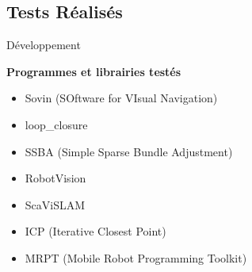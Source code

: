 \documentclass{beamer}
\begin{document}
\subsection*{Tests Réalisés}
\begin{frame}{Développement}
  \begin{center}
    \begin{Large}
      \textbf{Programmes et librairies testés}
    \end{Large}
  \end{center}
  \begin{itemize}
  \item Sovin (SOftware for VIsual Navigation)
  \item loop\_closure
  \item SSBA (Simple Sparse Bundle Adjustment)
  \item RobotVision
  \item ScaViSLAM
  \item ICP (Iterative Closest Point)
  \item MRPT (Mobile Robot Programming Toolkit)
  \end{itemize}
\end{frame}
\end{document}
